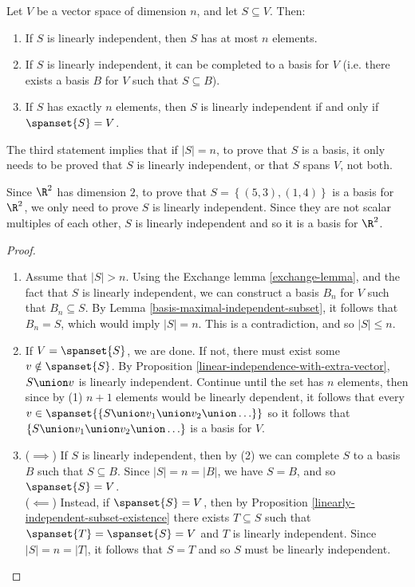 \documentclass[12pt]{article}
\begin{document}
\begin{cor}\label{basis-span-independence}
    Let $V$ be a vector space of dimension $n$, and let $S \subseteq V$. Then:
    \begin{enumerate}
        \item If $S$ is linearly independent, then $S$ has at most $n$ elements.
        \item If $S$ is linearly independent, it can be completed to a basis for $V$ (i.e. there exists a basis $B$ for $V$ such that $S \subseteq B$).
        \item If $S$ has exactly $n$ elements, then $S$ is linearly independent if and only if $\spanset{S} = V$.
    \end{enumerate}
\end{cor}

\begin{rmk}
    The third statement implies that if $|S| = n$, to prove that $S$ is a basis, it only needs to be proved that $S$ is linearly independent, or that $S$ spans $V$, not both.
\end{rmk}

\begin{exmp}
    Since $\R^2$ has dimension $2$, to prove that $S = \left\{(5, 3), (1, 4)\right\}$ is a basis for $\R^2$, we only need to prove $S$ is linearly independent. Since they are not scalar multiples of each other, $S$ is linearly independent and so it is a basis for $\R^2$.
\end{exmp}

\begin{proof}\proofbreak
    \begin{enumerate}
        \item Assume that $|S| > n$. Using the Exchange lemma \ref{exchange-lemma}, and the fact that $S$ is linearly independent, we can construct a basis $B_n$ for $V$ such that $B_n \subseteq S$. By Lemma \ref{basis-maximal-independent-subset}, it follows that $B_n = S$, which would imply $|S| = n$. This is a contradiction, and so $|S| \leq n$.
        \item If $V = \spanset{S}$, we are done. If not, there must exist some $v \notin \spanset{S}$. By Proposition \ref{linear-independence-with-extra-vector}, $S \union v$ is linearly independent. Continue until the set has $n$ elements, then since by (1) $n+1$ elements would be linearly dependent, it follows that every $v \in \spanset{\{S \union v_1 \union v_2 \union \ldots\}}$ so it follows that $\{S \union v_1 \union v_2 \union \ldots\}$ is a basis for $V$.
        \item ($\implies$) If $S$ is linearly independent, then by (2) we can complete $S$ to a basis $B$ such that $S \subseteq B$. Since $|S| = n = |B|$, we have $S = B$, and so $\spanset{S} = V$. \\ ($\impliedby$) Instead, if $\spanset{S} = V$, then by Proposition \ref{linearly-independent-subset-existence} there exists $T \subseteq S$ such that $\spanset{T} = \spanset{S} = V$ and $T$ is linearly independent. Since $|S| = n = |T|$, it follows that $S = T$ and so $S$ must be linearly independent.
    \end{enumerate}
\end{proof}
\end{document}
